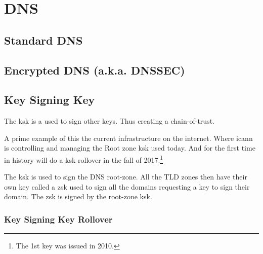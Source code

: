 \chapter{DNS}

\section{Standard DNS}

\section[DNSSEC]{Encrypted DNS (a.k.a. DNSSEC)}

\section[KSK]{Key Signing Key}

The \gls{ksk} is a used to sign other keys. Thus creating a chain-of-trust.

A prime example of this the current  infrastructure on the internet. Where \gls{icann} is controlling and managing the Root zone \gls{ksk} used today. And for the first time in history will do a \gls{ksk} rollover in the fall of 2017.\footnote{The 1st key was issued in 2010.}

The \gls{ksk} is used to sign the DNS root-zone. All the TLD zones then have their own key called a \gls{zsk} used to sign all the domains requesting a key to sign their domain. The \gls{zsk} is signed by the root-zone \gls{ksk}.

\subsection[Rollover]{Key Signing Key Rollover}

